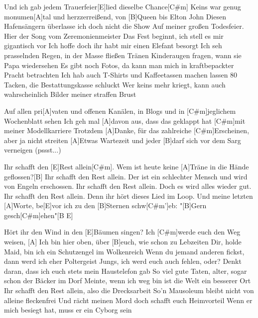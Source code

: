 



\begin{guitar}
	Und ich gab jedem Trauerfeier[E]lied dieselbe Chance[C#m]{}
	Keins war genug monumen[A]tal und herzzerreißend, von [B]Queen bis Elton John
	Diesen Hafensängern überlasse ich doch nicht die Show
	Auf meiner großen Todesfeier. Hier der Song vom Zeremonienmeister
	Das Fest beginnt, ich stell es mir gigantisch vor
	Ich hoffe doch ihr habt mir einen Elefant besorgt
	Ich seh prasselnden Regen, in der Masse fließen Tränen
	Kinderaugen fragen, wann sie Papa wiedersehen
	Es gibt noch Fotos, da kann man mich in kraftbepackter Pracht betrachten
	Ich hab auch T-Shirts und Kaffeetassen machen lassen
	80 Tacken, die Bestattungskasse schluckt
	Wer keins mehr kriegt, kann auch wahrscheinlich Bilder meiner straffen Brust
	
	Auf allen pri[A]vaten und offenen Kanälen, in Blogs und in [C#m]jeglichem Wochenblatt sehen
	Ich geh mal [A]davon aus, dass das geklappt hat [C#m]mit meiner Modellkarriere
	Trotzdem [A]Danke, für das zahlreiche [C#m]Erscheinen, aber ja nicht streiten
	[A]Etwas Wartezeit und jeder [B]darf sich vor dem Sarg verneigen (pssst...)
	
	Ihr schafft den [E]Rest allein[C#m].
	Wem ist heute keine [A]Träne in die Hände geflossen?[B]{}
	Ihr schafft den Rest allein.
	Der ist ein schlechter Mensch und wird von Engeln erschossen.
	Ihr schafft den Rest allein.
	Doch es wird alles wieder gut.
	Ihr schafft den Rest allein.
	Denn ihr hört dieses Lied im Loop.
	Und meine letzten [A]Worte, be[E]vor ich zu den [B]Sternen schw[C#m']eb:
	"[B]Gern gesch[C#m]ehen"[B E]{}
	
	Hört ihr den Wind in den [E]Bäumen singen? Ich [C#m]werde euch den Weg weisen, 
	[A] Ich bin hier oben, über [B]euch, wie schon zu Lebzeiten
	Dir, holde Maid, bin ich ein Schutzengel im Wolkenreich
	Wenn du jemand anderen fickst, dann werd ich eher Poltergeist
	Jungs, ich werd euch auch fehlen, oder?
	Denkt daran, dass ich euch stets mein Haustelefon gab
	So viel gute Taten, alter, sogar schon der Bäcker im Dorf
	Meinte, wenn ich weg bin ist die Welt ein besserer Ort
	Ihr schafft den Rest allein, also die Drecksarbeit
	So'n Mausoleum bleibt nicht von alleine fleckenfrei
	Und rächt meinen Mord doch schafft euch Heimvorteil
	Wenn er mich besiegt hat, muss er ein Cyborg sein
	

\end{guitar}
